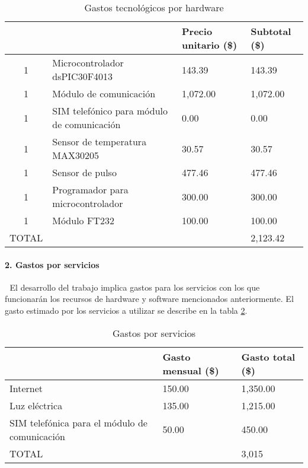 \begin{table}[htbp]
	\begin{center}
		\begin{tabular}{|c|p{4cm}|p{3cm}|p{3cm}|}
			\hline
			\thead{Cantidad}&\thead{Recurso}&\thead{Precio unitario\\(\$)}&\thead{Subtotal\\(\$)} \\
			\hline
			\hline
			1 &Microcontrolador dsPIC30F4013&143.39&143.39\\
			\hline
			1 & Módulo de comunicación &1,072.00&1,072.00 \\
			\hline
			1 &SIM telefónico para módulo de comunicación&0.00&0.00\\
			\hline
			1 &Sensor de temperatura MAX30205&30.57&30.57\\
			\hline
			1 &Sensor de pulso&477.46&477.46\\
			\hline
			1 &Programador para microcontrolador&300.00&300.00\\
			\hline
			1 &Módulo FT232&100.00&100.00\\
			\hline
			\hline
			TOTAL & &&2,123.42\\
			\hline
		\end{tabular}
		\caption{Gastos tecnológicos por hardware}
		\label{disenoEstructura:gastosHardware}
	\end{center}
\end{table}


\paragraph{2. Gastos por servicios} \textcolor{White}{.} \newline
El desarrollo del trabajo implica gastos para los servicios con los que funcionarán los recursos de hardware y software mencionados anteriormente. El gasto estimado por los servicios a utilizar se describe en la tabla \ref{disenoEstructura:gastosServicios}.\\


\begin{table}[htbp]
	\begin{center}
		\begin{tabular}{|p{4cm}|p{3cm}|p{3cm}|}
			\hline
			\thead{Servicio}&\thead{Gasto mensual\\(\$)}&\thead{Gasto total\\(\$)}\\
			\hline
			\hline
			Internet &150.00 &1,350.00 \\
			\hline
			Luz eléctrica &135.00 &1,215.00 \\
			\hline
			SIM telefónica para el módulo de comunicación &50.00 &450.00\\
			\hline
			\hline
			TOTAL & &3,015\\
			\hline
		\end{tabular}
		\caption{Gastos por servicios}
		\label{disenoEstructura:gastosServicios}
	\end{center}
\end{table}

